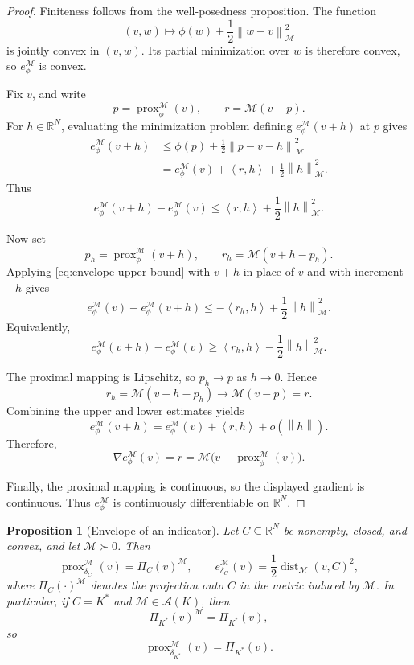 \documentclass[a4paper,11pt]{book}
\theoremstyle{plain}
\newtheorem{proposition}[theorem]{Proposition}
\theoremstyle{definition}
\theoremstyle{remark}
\numberwithin{equation}{chapter}
\numberwithin{algorithm}{chapter}
\newcommand{\R}{\mathbb{R}}
\newcommand{\proj}[2]{\Pi_{#2}\!\left(#1\right)}
\newcommand{\norm}[1]{\left\|#1\right\|}
\newcommand{\inner}[2]{\left\langle #1, #2 \right\rangle}
\newcommand{\prox}{\operatorname{prox}}
\DeclareMathOperator{\dist}{dist}
\begin{document}
	\begin{proof}
		Finiteness follows from the well-posedness proposition. The function
		\[
		(v,w)\longmapsto
		\phi(w)+\frac12\norm{w-v}_{\mathcal M}^2
		\]
		is jointly convex in \((v,w)\). Its partial minimization over \(w\) is
		therefore convex, so \(e_{\phi}^{\mathcal M}\) is convex.
		
		Fix \(v\), and write
		\[
		p=\prox_{\phi}^{\mathcal M}(v),
		\qquad
		r=\mathcal M(v-p).
		\]
		For \(h\in\R^N\), evaluating the minimization problem defining
		\(e_{\phi}^{\mathcal M}(v+h)\) at \(p\) gives
		\begin{align}
			e_{\phi}^{\mathcal M}(v+h)
			&\leq
			\phi(p)+\frac12\norm{p-v-h}_{\mathcal M}^2\\
			&=
			e_{\phi}^{\mathcal M}(v)
			+\inner{r}{h}
			+\frac12\norm{h}_{\mathcal M}^2.
		\end{align}
		Thus
		\begin{equation}
			e_{\phi}^{\mathcal M}(v+h)-e_{\phi}^{\mathcal M}(v)
			\leq
			\inner{r}{h}
			+\frac12\norm{h}_{\mathcal M}^2.
			\label{eq:envelope-upper-bound}
		\end{equation}
		
		Now set
		\[
		p_h=\prox_{\phi}^{\mathcal M}(v+h),
		\qquad
		r_h=\mathcal M(v+h-p_h).
		\]
		Applying \eqref{eq:envelope-upper-bound} with \(v+h\) in place of \(v\) and
		with increment \(-h\) gives
		\[
		e_{\phi}^{\mathcal M}(v)-e_{\phi}^{\mathcal M}(v+h)
		\leq
		-\inner{r_h}{h}
		+\frac12\norm{h}_{\mathcal M}^2.
		\]
		Equivalently,
		\[
		e_{\phi}^{\mathcal M}(v+h)-e_{\phi}^{\mathcal M}(v)
		\geq
		\inner{r_h}{h}
		-\frac12\norm{h}_{\mathcal M}^2.
		\]
		
		The proximal mapping is Lipschitz, so \(p_h\to p\) as \(h\to0\). Hence
		\[
		r_h=\mathcal M(v+h-p_h)\longrightarrow\mathcal M(v-p)=r.
		\]
		Combining the upper and lower estimates yields
		\[
		e_{\phi}^{\mathcal M}(v+h)
		=
		e_{\phi}^{\mathcal M}(v)
		+
		\inner{r}{h}
		+
		o(\norm{h}).
		\]
		Therefore,
		\[
		\nabla e_{\phi}^{\mathcal M}(v)
		=
		r
		=
		\mathcal M
		\bigl(
		v-\prox_{\phi}^{\mathcal M}(v)
		\bigr).
		\]
		
		Finally, the proximal mapping is continuous, so the displayed gradient is
		continuous. Thus \(e_{\phi}^{\mathcal M}\) is continuously differentiable
		on \(\R^N\).
	\end{proof}
	
	\begin{proposition}[Envelope of an indicator]
		Let \(C\subseteq\R^N\) be nonempty, closed, and convex, and let
		\(\mathcal M\succ0\). Then
		\begin{equation}
			\prox_{\delta_C}^{\mathcal M}(v)
			=
			\proj{v}{C}^{\mathcal M},
			\qquad
			e_{\delta_C}^{\mathcal M}(v)
			=
			\frac12\dist_{\mathcal M}(v,C)^2,
		\end{equation}
		where \(\proj{\cdot}{C}^{\mathcal M}\) denotes the projection onto \(C\) in
		the metric induced by \(\mathcal M\). In particular, if \(C=K^*\) and
		\(\mathcal M\in\mathcal A(K)\), then
		\[
		\proj{v}{K^*}^{\mathcal M}
		=
		\proj{v}{K^*},
		\]
		so
		\[
		\prox_{\delta_{K^*}}^{\mathcal M}(v)
		=
		\proj{v}{K^*}.
		\]
	\end{proposition}
	
\end{document}
